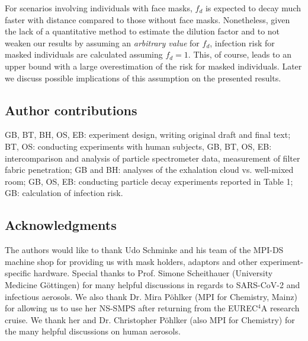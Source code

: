\documentclass[preprint]{elsarticle}
\begin{document}
For scenarios involving individuals with face masks, $f_{d}$ is expected to decay much faster with distance compared to those without face masks. 
Nonetheless, given the lack of a quantitative method to estimate the dilution factor and to not weaken our results by assuming an \emph{arbitrary value} for $f_{d}$, infection risk for masked individuals are calculated assuming $f_{d}=1$.
This, of course, leads to an upper bound with a large overestimation of the risk for masked individuals. Later we discuss possible implications of this assumption on the presented results.


\subsection*{Author contributions}
GB, BT, BH, OS, EB: experiment design, writing original draft and final text; BT, OS: conducting experiments with human subjects, GB, BT, OS, EB: intercomparison and analysis of particle spectrometer data, measurement of filter fabric penetration; GB and BH: analyses of the exhalation cloud vs. well-mixed room; GB, OS, EB: conducting particle decay experiments reported in Table 1; GB: calculation of infection risk.

\subsection*{Acknowledgments}
The authors would like to thank Udo Schminke and his team of the MPI-DS machine shop for providing us with mask holders, adaptors and other experiment-specific hardware. Special thanks to Prof. Simone Scheithauer (University Medicine G\"ottingen) for many helpful discussions in regards to SARS-CoV-2 and infectious aerosols. We also thank Dr. Mira P\"ohlker (MPI for Chemistry, Mainz) for allowing us to use her NS-SMPS after returning from the EUREC$^4$A research cruise. We thank her and Dr. Christopher P\"ohlker (also MPI for Chemistry) for the many helpful discussions on human aerosols.




\end{document}
